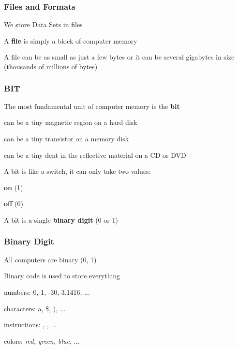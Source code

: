 \documentclass[12pt]{beamer}\usepackage[]{graphicx}\usepackage[]{color}
\begin{document}

\begin{frame}
\frametitle{Files and Formats}

\bbi
  \item We store Data Sets in files
  \item A \textbf{file} is simply a block of computer memory
  \item A file can be as small as just a few bytes or it can be several gigabytes in size (thousands of millions of bytes)
\ei

\end{frame}


\begin{frame}
\frametitle{BIT}

\bbi
  \item The most fundamental unit of computer memory is the \textbf{bit}
  \bi
    \item can be a tiny magnetic region on a hard disk
    \item can be a tiny transistor on a memory disk
    \item can be a tiny dent in the reflective material on a CD or DVD
  \ei
  \item A bit is like a {\hilit switch}, it can only take two values: 
  \bi
    \item \textbf{on} (1)
    \item \textbf{off} (0)
  \ei
  \item A bit is a single \textbf{binary digit} (0 or 1)
\ei

\end{frame}


\begin{frame}
\frametitle{Binary Digit}

\bbi
  \item All computers are binary (0, 1)
  \item Binary code is used to store everything
  \bi
    \item numbers: 0, 1, -30, 3.1416, ...
    \item characters: a, \$, ), ...
    \item instructions: , , ...
    \item colors: \textit{red, green, blue}, ...
  \ei
\ei

\end{frame}
\end{document}
